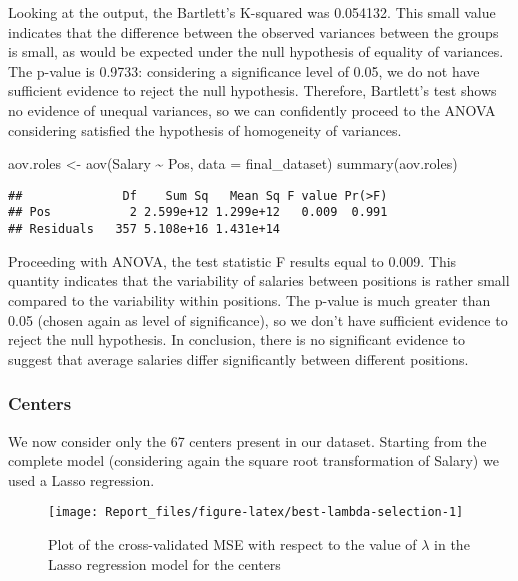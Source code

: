 \documentclass[
]{article}
\newenvironment{Shaded}{\begin{snugshade}}{\end{snugshade}}
\newcommand{\AttributeTok}[1]{\textcolor[rgb]{0.77,0.63,0.00}{#1}}
\newcommand{\FunctionTok}[1]{\textcolor[rgb]{0.00,0.00,0.00}{#1}}
\newcommand{\NormalTok}[1]{#1}
\newcommand{\OtherTok}[1]{\textcolor[rgb]{0.56,0.35,0.01}{#1}}
\newcommand{\SpecialCharTok}[1]{\textcolor[rgb]{0.00,0.00,0.00}{#1}}
\begin{document}
Looking at the output, the Bartlett's K-squared was 0.054132. This small
value indicates that the difference between the observed variances
between the groups is small, as would be expected under the null
hypothesis of equality of variances. The p-value is 0.9733: considering
a significance level of 0.05, we do not have sufficient evidence to
reject the null hypothesis. Therefore, Bartlett's test shows no evidence
of unequal variances, so we can confidently proceed to the ANOVA
considering satisfied the hypothesis of homogeneity of variances.

\begin{Shaded}
\begin{Highlighting}[]
\NormalTok{aov.roles }\OtherTok{\textless{}{-}} \FunctionTok{aov}\NormalTok{(Salary }\SpecialCharTok{\textasciitilde{}}\NormalTok{ Pos, }\AttributeTok{data =}\NormalTok{ final\_dataset)}
\FunctionTok{summary}\NormalTok{(aov.roles)}
\end{Highlighting}
\end{Shaded}

\begin{verbatim}
##              Df    Sum Sq   Mean Sq F value Pr(>F)
## Pos           2 2.599e+12 1.299e+12   0.009  0.991
## Residuals   357 5.108e+16 1.431e+14
\end{verbatim}

Proceeding with ANOVA, the test statistic F results equal to 0.009. This
quantity indicates that the variability of salaries between positions is
rather small compared to the variability within positions. The p-value
is much greater than 0.05 (chosen again as level of significance), so we
don't have sufficient evidence to reject the null hypothesis. In
conclusion, there is no significant evidence to suggest that average
salaries differ significantly between different positions.

\hypertarget{centers}{%
\subsubsection{Centers}\label{centers}}

We now consider only the 67 centers present in our dataset. Starting
from the complete model (considering again the square root
transformation of Salary) we used a Lasso regression.

\begin{figure}

{\centering \texttt{[image: Report\_files/figure-latex/best-lambda-selection-1]} 

}

\caption{Plot of the cross-validated MSE with respect to the value of $\lambda$ in the Lasso regression model for the centers}\label{fig:best-lambda-selection}
\end{figure}
\end{document}
